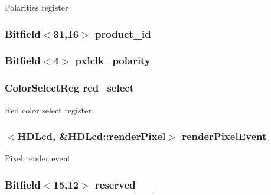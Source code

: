 \label{classHDLcd_a1b4fe6c75f98c50fad2eebc75f143dd2}
Polarities register \hypertarget{classHDLcd_ac95f3b4958485c9925b2cb7f0302921f}{
\subsubsection[{product\_\-id}]{\setlength{\rightskip}{0pt plus 5cm}Bitfield$<$31,16$>$ {\bf product\_\-id}}}
\label{classHDLcd_ac95f3b4958485c9925b2cb7f0302921f}
\hypertarget{classHDLcd_a4fa9bf08d013c014d2e73e86607b4bed}{
\subsubsection[{pxlclk\_\-polarity}]{\setlength{\rightskip}{0pt plus 5cm}Bitfield$<$4$>$ {\bf pxlclk\_\-polarity}}}
\label{classHDLcd_a4fa9bf08d013c014d2e73e86607b4bed}
\hypertarget{classHDLcd_afd72c0120af049b009667393e8d7ce77}{
\subsubsection[{red\_\-select}]{\setlength{\rightskip}{0pt plus 5cm}ColorSelectReg {\bf red\_\-select}}}
\label{classHDLcd_afd72c0120af049b009667393e8d7ce77}
Red color select register \hypertarget{classHDLcd_af37803439ed3050f73510b0f8e0523fc}{
\subsubsection[{renderPixelEvent}]{$<${\bf HDLcd}, \&HDLcd::renderPixel$>$ {\bf renderPixelEvent}}}
\label{classHDLcd_af37803439ed3050f73510b0f8e0523fc}
Pixel render event \hypertarget{classHDLcd_aead24f2eb2742ac7708882a7d9616412}{
\subsubsection[{reserved\_\-15\_\-12}]{\setlength{\rightskip}{0pt plus 5cm}Bitfield$<$15,12$>$ {\bf reserved\_\_}}}
